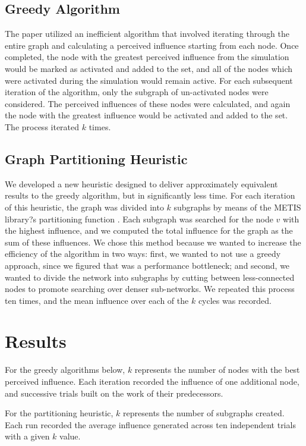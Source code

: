 \documentclass{article}
\begin{document}
  \subsection{Greedy Algorithm}
    The paper utilized an inefficient algorithm that involved iterating through the entire graph and calculating a perceived influence starting from each node. Once completed, the node with the greatest perceived influence from the simulation would be marked as activated and added to the set, and all of the nodes which were activated during the simulation would remain active. For each subsequent iteration of the algorithm, only the subgraph of un-activated nodes were considered. The perceived influences of these nodes were calculated, and again the node with the greatest influence would be activated and added to the set. The process iterated $k$ times.

  \subsection{Graph Partitioning Heuristic}
    We developed a new heuristic designed to deliver approximately equivalent results to the greedy algorithm, but in significantly less time. For each iteration of this heuristic, the graph was divided into $k$ subgraphs by means of the METIS library?s partitioning function \cite{metis}. Each subgraph was searched for the node $v$ with the highest influence, and we computed the total influence for the graph as the sum of these influences. We chose this method because we wanted to increase the efficiency of the algorithm in two ways: first, we wanted to not use a greedy approach, since we figured that was a performance bottleneck; and second, we wanted to divide the network into subgraphs by cutting between less-connected nodes to promote searching over denser sub-networks. We repeated this process ten times, and the mean influence over each of the $k$ cycles was recorded.

\pagebreak
\section{Results}
  For the greedy algorithms below, $k$ represents the number of nodes with the best perceived influence. Each iteration recorded the influence of one additional node, and successive trials built on the work of their predecessors.
  
  For the partitioning heuristic, $k$ represents the number of subgraphs created. Each run recorded the average influence generated across ten independent trials with a given $k$ value.
  
\end{document}
